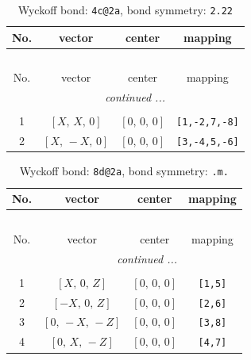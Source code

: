 \documentclass[fleqn,8pt]{jsarticle}
\begin{document}
\renewcommand{\arraystretch}{1.2}
\begin{longtable}{cccc}
\caption{Wyckoff bond: {\tt 4c@2a}, bond symmetry: {\tt 2.22}}
 \\
 \hline \hline
No. & vector & center & mapping \\ \hline \endfirsthead

\multicolumn{3}{l}{\tablename\ \thetable{}} \\
 \hline \hline
No. & vector & center & mapping \\ \hline \endhead

 \hline \hline
\multicolumn{3}{r}{\footnotesize\it continued ...} \\ \endfoot

 \hline \hline
\multicolumn{3}{r}{} \\ \endlastfoot

1 & $\left[ X,\, X,\, 0 \right]$ & $\left[ 0,\, 0,\, 0 \right]$ & {\tt [1,-2,7,-8]} \\ \hline
2 & $\left[ X,\, - X,\, 0 \right]$ & $\left[ 0,\, 0,\, 0 \right]$ & {\tt [3,-4,5,-6]} \\
\end{longtable}
\renewcommand{\arraystretch}{1.2}
\begin{longtable}{cccc}
\caption{Wyckoff bond: {\tt 8d@2a}, bond symmetry: {\tt .m.}}
 \\
 \hline \hline
No. & vector & center & mapping \\ \hline \endfirsthead

\multicolumn{3}{l}{\tablename\ \thetable{}} \\
 \hline \hline
No. & vector & center & mapping \\ \hline \endhead

 \hline \hline
\multicolumn{3}{r}{\footnotesize\it continued ...} \\ \endfoot

 \hline \hline
\multicolumn{3}{r}{} \\ \endlastfoot

1 & $\left[ X,\, 0,\, Z \right]$ & $\left[ 0,\, 0,\, 0 \right]$ & {\tt [1,5]} \\ \hline
2 & $\left[ - X,\, 0,\, Z \right]$ & $\left[ 0,\, 0,\, 0 \right]$ & {\tt [2,6]} \\ \hline
3 & $\left[ 0,\, - X,\, - Z \right]$ & $\left[ 0,\, 0,\, 0 \right]$ & {\tt [3,8]} \\ \hline
4 & $\left[ 0,\, X,\, - Z \right]$ & $\left[ 0,\, 0,\, 0 \right]$ & {\tt [4,7]} \\
\end{longtable}
\end{document}
